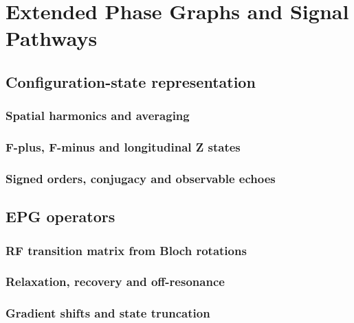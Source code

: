 \chapter{Extended Phase Graphs and Signal Pathways}
\label{ch:13}

\section{Configuration-state representation}
\label{sec:13:configuration-state-representation}
\subsection{Spatial harmonics and averaging}
\subsection{F-plus, F-minus and longitudinal Z states}
\subsection{Signed orders, conjugacy and observable echoes}

\section{EPG operators}
\label{sec:13:epg-operators}
\subsection{RF transition matrix from Bloch rotations}
\subsection{Relaxation, recovery and off-resonance}
\subsection{Gradient shifts and state truncation}

